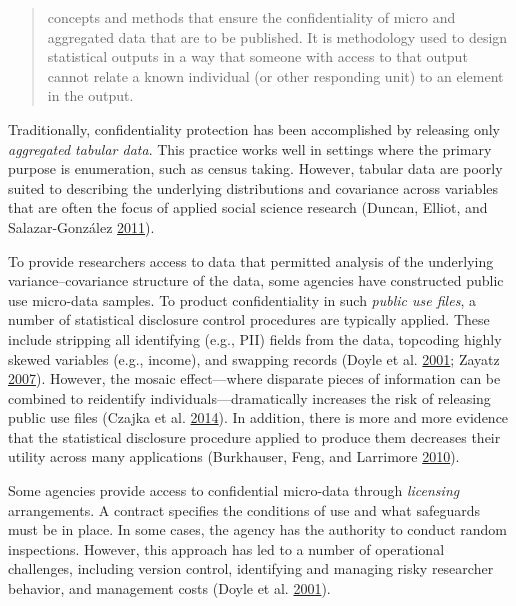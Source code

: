 \documentclass[]{krantz}
\begin{document}
\begin{quote}
concepts and methods that ensure the confidentiality of micro and
aggregated data that are to be published. It is methodology used to
design statistical outputs in a way that someone with access to that
output cannot relate a known individual (or other responding unit) to an
element in the output.
\end{quote}

Traditionally, confidentiality protection has been accomplished by
releasing only \emph{aggregated tabular data}. This practice works well
in settings where the primary purpose is enumeration, such as census
taking. However, tabular data are poorly suited to describing the
underlying distributions and covariance across variables that are often
the focus of applied social science research (Duncan, Elliot, and
Salazar-González \protect\hyperlink{ref-duncanstatistical}{2011}).

To provide researchers access to data that permitted analysis of the
underlying variance--covariance structure of the data, some agencies
have constructed public use micro-data samples. To product
confidentiality in such \emph{public use files}, a number of statistical
disclosure control procedures are typically applied. These include
stripping all identifying (e.g., PII) fields from the data, topcoding
highly skewed variables (e.g., income), and swapping records (Doyle et
al. \protect\hyperlink{ref-doyle2001confidentiality}{2001}; Zayatz
\protect\hyperlink{ref-zayatz2007disclosure}{2007}). However, the mosaic
effect---where disparate pieces of information can be combined to
reidentify individuals---dramatically increases the risk of releasing
public use files (Czajka et al.
\protect\hyperlink{ref-czajka2014minimizing}{2014}). In addition, there
is more and more evidence that the statistical disclosure procedure
applied to produce them decreases their utility across many applications
(Burkhauser, Feng, and Larrimore
\protect\hyperlink{ref-burkhauser2010improving}{2010}).

Some agencies provide access to confidential micro-data through
\emph{licensing} arrangements. A contract specifies the conditions of
use and what safeguards must be in place. In some cases, the agency has
the authority to conduct random inspections. However, this approach has
led to a number of operational challenges, including version control,
identifying and managing risky researcher behavior, and management costs
(Doyle et al. \protect\hyperlink{ref-doyle2001confidentiality}{2001}).
\end{document}
